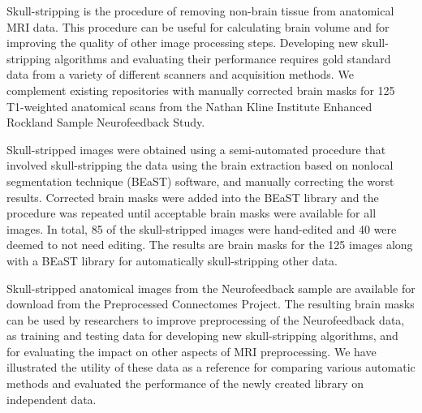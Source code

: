 Skull-stripping is the procedure of removing non-brain tissue from anatomical MRI data. This procedure can be useful for calculating brain volume and for improving the quality of other image processing steps. Developing new skull-stripping algorithms and evaluating their performance requires gold standard data from a variety of different scanners and acquisition methods. We complement existing repositories with manually corrected brain masks for 125 T1-weighted anatomical scans from the Nathan Kline Institute Enhanced Rockland Sample Neurofeedback Study.

Skull-stripped images were obtained using a semi-automated procedure that involved skull-stripping the data using the brain extraction based on nonlocal segmentation technique (BEaST) software, and manually correcting the worst results. Corrected brain masks were added into the BEaST library and the procedure was repeated until acceptable brain masks were available for all images. In total, 85 of the skull-stripped images were hand-edited and 40 were deemed to not need editing. The results are brain masks for the 125 images along with a BEaST library for automatically skull-stripping other data.


Skull-stripped anatomical images from the Neurofeedback sample are available for download from the Preprocessed Connectomes Project. The resulting brain masks can be used by researchers to improve preprocessing of the Neurofeedback data, as training and testing data for developing new skull-stripping algorithms, and for evaluating the impact on other aspects of MRI preprocessing. We have illustrated the utility of these data as a reference for comparing various automatic methods and evaluated the performance of the newly created library on independent data.
